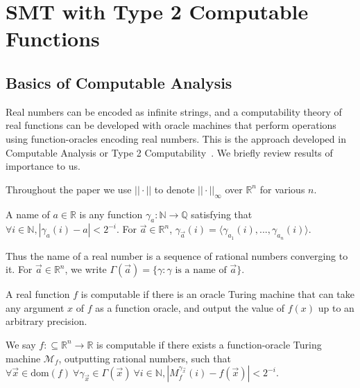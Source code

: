 \documentclass[envcountsect]{llncs}
\newcommand{\dom}{\mathrm{dom}}
\begin{document}
\section{SMT with Type 2 Computable Functions}\label{smt}
\subsection{Basics of Computable Analysis}

Real numbers can be encoded as infinite strings, and a computability theory of real functions can be developed with oracle machines that perform operations using function-oracles encoding real numbers. This is the approach developed in Computable Analysis or Type 2 Computability~\cite{CAbook,Kobook,vasco}. We briefly review results of importance to us.


Throughout the paper we use $||\cdot||$ to denote $||\cdot||_{\infty}$ over $\mathbb{R}^n$ for various $n$. 

\begin{definition}[Names]
A name of $a\in \mathbb{R}$ is any function $\mathcal{\gamma}_a: \mathbb{N}\rightarrow \mathbb{Q}$ satisfying that $\forall i\in \mathbb{N}, |\gamma_a(i) - a|<2^{-i}.$ For $\vec a\in \mathbb{R}^n$, $\gamma_{\vec a}(i) = \langle \gamma_{a_1}(i), ..., \gamma_{a_n}(i)\rangle$.  
\end{definition}
Thus the name of a real number is a sequence of rational numbers converging to it. For $\vec a\in \mathbb{R}^n$, we write $\Gamma(\vec a) = \{\gamma: \gamma\mbox{ is a name of }\vec a\}$. 

A real function $f$ is computable if there is an oracle Turing machine that can take any argument $x$ of $f$ as a function oracle, and output the value of $f(x)$ up to an arbitrary precision. 
\begin{definition}
We say $f:\subseteq\mathbb{R}^n\rightarrow \mathbb{R}$ is computable if there exists a function-oracle Turing machine $\mathcal{M}_f$, outputting rational numbers, such that $\forall \vec x \in \dom(f)\ \forall \gamma_{\vec x}\in \Gamma(\vec x)\ \forall i \in \mathbb{N}, |M_f^{\gamma_{\vec x}}(i) - f(\vec x)|<2^{-i}.$
\end{definition}
\end{document}
